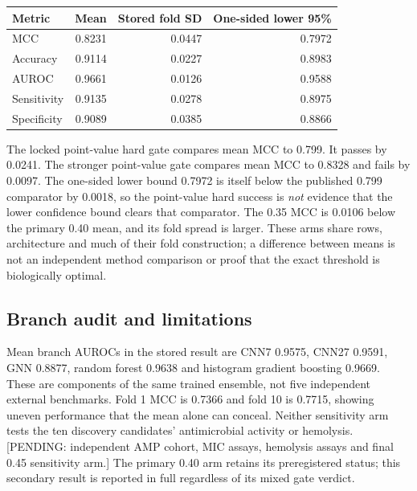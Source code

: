 \begin{center}\small\begin{tabular}{lrrr}\hline
Metric & Mean & Stored fold SD & One-sided lower 95\%\\\hline
MCC & 0.8231 & 0.0447 & 0.7972\\
Accuracy & 0.9114 & 0.0227 & 0.8983\\
AUROC & 0.9661 & 0.0126 & 0.9588\\
Sensitivity & 0.9135 & 0.0278 & 0.8975\\
Specificity & 0.9089 & 0.0385 & 0.8866\\\hline
\end{tabular}\end{center}
The locked point-value hard gate compares mean MCC to 0.799. It passes by 0.0241. The stronger point-value gate compares mean MCC to 0.8328 and fails by 0.0097. The one-sided lower bound 0.7972 is itself below the published 0.799 comparator by 0.0018, so the point-value hard success is \emph{not} evidence that the lower confidence bound clears that comparator. The 0.35 MCC is 0.0106 below the primary 0.40 mean, and its fold spread is larger. These arms share rows, architecture and much of their fold construction; a difference between means is not an independent method comparison or proof that the exact threshold is biologically optimal.

\subsection*{Branch audit and limitations}
Mean branch AUROCs in the stored result are CNN7 0.9575, CNN27 0.9591, GNN 0.8877, random forest 0.9638 and histogram gradient boosting 0.9669. These are components of the same trained ensemble, not five independent external benchmarks. Fold 1 MCC is 0.7366 and fold 10 is 0.7715, showing uneven performance that the mean alone can conceal. Neither sensitivity arm tests the ten discovery candidates' antimicrobial activity or hemolysis. [PENDING: independent AMP cohort, MIC assays, hemolysis assays and final 0.45 sensitivity arm.] The primary 0.40 arm retains its preregistered status; this secondary result is reported in full regardless of its mixed gate verdict.
